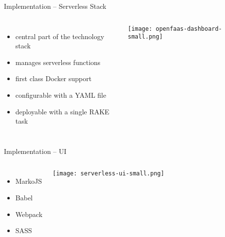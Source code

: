 \documentclass[aspectratio=1610]{beamer}
\begin{document}
  \begin{frame}{Implementation -- Serverless Stack}
    \begin{columns}
        \begin{itemize}
          \item central part of the technology stack
          \item manages serverless functions
          \item first class Docker support
          \item configurable with a YAML file
          \item deployable with a single RAKE task
        \end{itemize}
        \vfill
        \centering
        \texttt{[image: openfaas-dashboard-small.png]}
     \end{columns}
  \end{frame}

  \begin{frame}{Implementation -- UI}
    \begin{columns}
        \begin{itemize}
          \item MarkoJS
          \item Babel
          \item Webpack
          \item SASS
        \end{itemize}
        \vfill
        \centering
        \texttt{[image: serverless-ui-small.png]}
     \end{columns}
  \end{frame}
\end{document}
